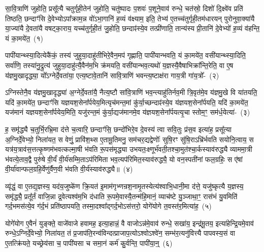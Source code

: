 \setcounter{anuvakam}{0}
सा॒वि॒त्राणि॑ जुहोति॒ प्रसू᳚त्यै चतुर्गृही॒तेन॑ जुहोति॒ चतु॑ष्पादः प॒शवः॑ प॒शूने॒वाव॑ रुन्धे॒ चत॑स्रो॒ दिशो॑ दि॒क्ष्वे॑व प्रति॑ तिष्ठति॒ छन्दाꣳ॑सि दे॒वेभ्यो\-ऽपा᳚क्राम॒न्न वो॑\-ऽभा॒गानि॑ ह॒व्यं व॑क्ष्याम॒ इति॒ तेभ्य॑ ए॒तच्च॑तुर्गृही॒तम॑धारयन् पुरोनुवा॒क्या॑यै या॒ज्या॑यै दे॒वता॑यै वषट्का॒राय॒ यच्च॑तुर्गृही॒तं जु॒होति॒ छन्दाꣴ॑स्ये॒व तत्प्री॑णाति॒ तान्य॑स्य प्री॒तानि॑ दे॒वेभ्यो॑ ह॒व्यं व॑हन्ति॒ यं का॒मये॑त॒~(१)\ip

पापी॑यान्थ्स्या॒दित्येकै॑कं॒ तस्य॑ जुहुया॒दाहु॑तीभिरे॒वैन॒मप॑ गृह्णाति॒ पापी॑यान्भवति॒ यं का॒मये॑त॒ वसी॑यान्थ्स्या॒दिति॒ सर्वा॑णि॒ तस्या॑नु॒द्रुत्य॑ जुहुया॒दाहु॑त्यै॒वैन॑म॒भि क्र॑मयति॒ वसी॑यान्भव॒त्यथो॑ य॒ज्ञस्यै॒वैषाभिक्रा᳚न्ति॒रेति॒ वा ए॒ष य॑ज्ञमु॒खादृद्ध्या॒ यो᳚\-ऽग्नेर्दे॒वता॑या॒ एत्य॒ष्टावे॒तानि॑ सावि॒त्राणि॑ भवन्त्य॒ष्टाक्ष॑रा गाय॒त्री गा॑य॒त्रो᳚-~(२)\ip

ऽग्निस्तेनै॒व य॑ज्ञमु॒खादृद्ध्या॑ अ॒ग्नेर्दे॒वता॑यै॒ नैत्य॒ष्टौ सा॑वि॒त्राणि॑ भव॒न्त्याहु॑तिर्नव॒मी त्रि॒वृत॑मे॒व य॑ज्ञमु॒खे वि या॑तयति॒ यदि॑ का॒मये॑त॒ छन्दाꣳ॑सि यज्ञयश॒सेना᳚र्पयेय॒मित्यृच॑मन्त॒मां कु॑र्या॒च्छन्दाꣴ॑स्ये॒व य॑ज्ञयश॒सेना᳚र्पयति॒ यदि॑ का॒मये॑त॒ यज॑मानं यज्ञयश॒सेना᳚र्पयेय॒मिति॒ यजु॑रन्त॒मं कु॑र्या॒द्यज॑मानमे॒व य॑ज्ञयश॒सेना᳚र्पयत्यृ॒चा स्तोम॒ꣳ॒ सम॑र्ध॒येत्या॑-~(३)\ip

ह॒ समृ॑द्ध्यै च॒तुर्भि॒रभ्रि॒मा द॑त्ते च॒त्वारि॒ छन्दाꣳ॑सि॒ छन्दो॑भिरे॒व दे॒वस्य॑ त्वा सवि॒तुः प्र॑स॒व इत्या॑ह॒ प्रसू᳚त्या अ॒ग्निर्दे॒वेभ्यो॒ निला॑यत॒ स वेणुं॒ प्रावि॑श॒थ्स ए॒तामू॒तिमनु॒ सम॑चर॒द्यद्वेणोः᳚ सुषि॒रꣳ सु॑षि॒रा\-ऽ\-भ्रि॑र्भवति सयोनि॒त्वाय॒ स यत्र॑य॒त्राव॑स॒त्तत्कृ॒ष्णम॑भवत्कल्मा॒षी भ॑वति रू॒पस॑मृद्ध्या उभयतः॒क्ष्णूर्भ॑वती॒तश्चा॒मुत॑श्चा॒र्कस्याव॑रुद्ध्यै व्याममा॒त्री भ॑वत्ये॒ताव॒द्वै पुरु॑षे वी॒र्यं॑ वी॒र्य॑सम्मि॒ता\-ऽप॑रिमिता भव॒त्यप॑रिमित॒स्याव॑रुद्ध्यै॒ यो वन॒स्पती॑नां फल॒ग्रहिः॒ स ए॑षां वी॒र्या॑वान्फल॒ग्रहि॒र्वेणु॑र्वैण॒वी भ॑वति वी॒र्य॑स्याव॑रुद्ध्यै॥~(४)\ip

{\anuvakamend[{का॒मये॑त गाय॒त्रो᳚\-ऽर्ध॒येति॑ च स॒प्तविꣳ॑शतिश्च}]}

व्यृ॑द्धं॒ वा ए॒तद्य॒ज्ञस्य॒ यद॑य॒जुष्के॑ण क्रि॒यत॑ इ॒माम॑गृभ्णन्रश॒नामृ॒तस्येत्य॑श्वाभि॒धानी॒मा द॑त्ते॒ यजु॑ष्कृत्यै य॒ज्ञस्य॒ समृ॑द्ध्यै॒ प्रतू᳚र्तं वाजि॒न्ना द्र॒वेत्यश्व॑म॒भि द॑धाति रू॒पमे॒वास्यै॒तन्म॑हि॒मानं॒ व्याच॑ष्टे यु॒ञ्जाथा॒ꣳ॒ रास॑भं यु॒वमिति॑ गर्द॒भमस॑त्ये॒व ग॑र्द॒भं प्रति॑\-ष्ठापयति॒ तस्मा॒दश्वा᳚द्गर्द॒भो\-ऽस॑त्तरो॒ योगे॑योगे त॒वस्त॑र॒मित्या॑ह॒~(५)\ip

योगे॑योग ए॒वैनं॑ युङ्क्ते॒ वाजे॑वाजे हवामह॒ इत्या॒हान्नं॒ वै वाजो\-ऽन्न॑मे॒वाव॑ रुन्धे॒ सखा॑य॒ इन्द्र॑मू॒तय॒ इत्या॑हेन्द्रि॒यमे॒वाव॑ रुन्धे॒\-ऽग्निर्दे॒वेभ्यो॒ निला॑यत॒ तं प्र॒जा\-प॑ति॒रन्व॑विन्दत्प्राजाप॒त्यो\-ऽश्वो\-ऽश्वे॑न॒ सम्भ॑र॒त्यनु॑वित्त्यै पापवस्य॒सं वा ए॒तत्क्रि॑यते॒ यच्छ्रेय॑सा च॒ पापी॑यसा च समा॒नं कर्म॑ कु॒र्वन्ति॒ पापी॑या॒न्॒~(६)\ip


